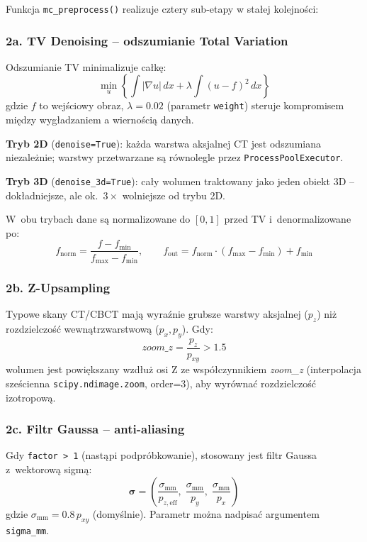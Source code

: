 \documentclass[12pt,a4paper]{article}
\begin{document}
Funkcja \texttt{mc\_preprocess()} realizuje cztery sub-etapy w stałej kolejności:

\subsubsection*{2a. TV Denoising -- odszumianie Total Variation}

Odszumianie TV minimalizuje całkę:
\[
  \min_u \left\{ \int |\nabla u|\, dx + \lambda \int (u - f)^2\, dx \right\}
\]
gdzie $f$ to wejściowy obraz, $\lambda = 0.02$ (parametr \texttt{weight}) steruje
kompromisem między wygładzaniem a wiernością danych.

\textbf{Tryb 2D} (\texttt{denoise=True}): każda warstwa aksjalnej CT jest
odszumiana niezależnie; warstwy przetwarzane są równolegle przez
\texttt{ProcessPoolExecutor}.

\textbf{Tryb 3D} (\texttt{denoise\_3d=True}): cały wolumen traktowany jako jeden
obiekt 3D -- dokładniejsze, ale ok.\ $3\times$ wolniejsze od trybu 2D.

W~obu trybach dane są normalizowane do $[0, 1]$ przed TV i~denormalizowane po:
\[
  f_{\text{norm}} = \frac{f - f_{\min}}{f_{\max} - f_{\min}}, \qquad
  f_{\text{out}} = f_{\text{norm}} \cdot (f_{\max} - f_{\min}) + f_{\min}
\]

\subsubsection*{2b. Z-Upsampling}

Typowe skany CT/CBCT mają wyraźnie grubsze warstwy aksjalnej ($p_z$) niż
rozdzielczość wewnątrzwarstwową ($p_x, p_y$). Gdy:
\[
  \textit{zoom\_z} = \frac{p_z}{p_{xy}} > 1.5
\]
wolumen jest powiększany wzdłuż osi Z ze współczynnikiem \textit{zoom\_z}
(interpolacja sześcienna \texttt{scipy.ndimage.zoom}, order=3), aby wyrównać
rozdzielczość izotropową.

\subsubsection*{2c. Filtr Gaussa -- anti-aliasing}

Gdy \texttt{factor > 1} (nastąpi podpróbkowanie), stosowany jest filtr Gaussa
z~wektorową sigmą:
\[
  \boldsymbol{\sigma} = \left(\frac{\sigma_{\text{mm}}}{p_{z,\text{eff}}},\;
    \frac{\sigma_{\text{mm}}}{p_y},\; \frac{\sigma_{\text{mm}}}{p_x}\right)
\]
gdzie $\sigma_{\text{mm}} = 0.8\,p_{xy}$ (domyślnie). Parametr można nadpisać
argumentem \texttt{sigma\_mm}.
\end{document}
